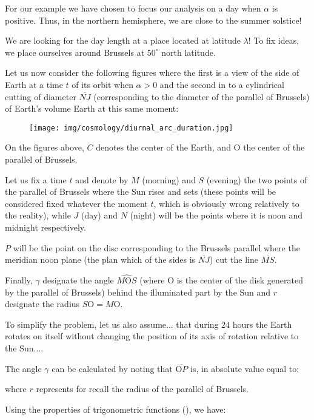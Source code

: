	For our example we have chosen to focus our analysis on a day when $\alpha$ is positive. Thus, in the northern hemisphere, we are close to the summer solstice!

	We are looking for the day length at a place located at latitude $\lambda$! To fix ideas, we place ourselves around Brussels at $50^\circ$ north latitude.
	
	Let us now consider the following figures where the first is a view of the side of Earth at a time $t$ of its orbit when $\alpha>0$ and the second in to a cylindrical cutting of diameter $\overline{NJ}$ (corresponding to the diameter of the parallel of Brussels) of Earth's volume Earth at this same moment:
	\begin{figure}[H]
		\begin{center}
		\texttt{[image: img/cosmology/diurnal\_arc\_duration.jpg]}
		\end{center}
	\end{figure}
	On the figures above, $C$ denotes the center of the Earth, and O the center of the parallel of Brussels.

	Let us fix a time $t$ and denote by $M$ (morning) and $S$ (evening) the two points of the parallel of Brussels where the Sun rises and sets (these points will be considered fixed whatever the moment $t$, which is obviously wrong relatively to the reality), while $J$ (day) and $N$ (night) will be the points where it is noon and midnight respectively.

	$P$ will be the point on the disc corresponding to the Brussels parallel where the meridian noon plane  (the plan which of the sides is $\overline{NJ}$) cut the line $\overline{MS}$.

	Finally, $\gamma$ designate the angle $\widehat{M\text{O}S}$ (where O is the center of the disk generated by the parallel of Brussels) behind the illuminated part by the Sun and $r$ designate the radius $S\text{O}=M\text{O}$.

	To simplify the problem, let us also assume... that during $24$ hours the Earth rotates on itself without changing the position of its axis of rotation relative to the Sun....

	The angle $\gamma$ can be calculated by noting that $\overline{\text{O}P}$ is, in absolute value equal to:
	
	where $r$ represents for recall the radius of the parallel of Brussels.
	
	Using the properties of trigonometric functions (), we have:
	
